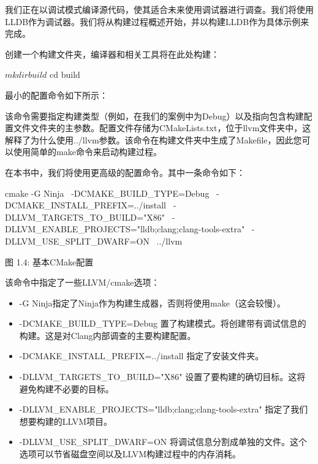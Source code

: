 

我们正在以调试模式编译源代码，使其适合未来使用调试器进行调查。我们将使用LLDB作为调试器。我们将从构建过程概述开始，并以构建LLDB作为具体示例来完成。


创建一个构建文件夹，编译器和相关工具将在此处构建：

\begin{shell}
$ mkdir build
$ cd build
\end{shell}

最小的配置命令如下所示：


该命令需要指定构建类型（例如，在我们的案例中为Debug）以及指向包含构建配置文件文件夹的主参数。配置文件存储为CMakeLists.txt，位于llvm文件夹中，这解释了为什么使用../llvm参数。该命令在构建文件夹中生成了Makefile，因此您可以使用简单的make命令来启动构建过程。

在本书中，我们将使用更高级的配置命令。其中一条命令如下：

\begin{shell}
cmake -G Ninja \
  -DCMAKE_BUILD_TYPE=Debug \
  -DCMAKE_INSTALL_PREFIX=../install \
  -DLLVM_TARGETS_TO_BUILD="X86" \
  -DLLVM_ENABLE_PROJECTS="lldb;clang;clang-tools-extra" \
  -DLLVM_USE_SPLIT_DWARF=ON \
  ../llvm
\end{shell}

\begin{center}
图 1.4: 基本CMake配置
\end{center}

该命令中指定了一些LLVM/cmake选项：

\begin{itemize}
\item
-G Ninja指定了Ninja作为构建生成器，否则将使用make（这会较慢）。

\item
-DCMAKE\_BUILD\_TYPE=Debug 置了构建模式。将创建带有调试信息的构建。这是对Clang内部调查的主要构建配置。

\item
-DCMAKE\_INSTALL\_PREFIX=../install 指定了安装文件夹。

\item
-DLLVM\_TARGETS\_TO\_BUILD="X86" 设置了要构建的确切目标。这将避免构建不必要的目标。

\item
-DLLVM\_ENABLE\_PROJECTS="lldb;clang;clang-tools-extra" 指定了我们想要构建的LLVM项目。

\item
-DLLVM\_USE\_SPLIT\_DWARF=ON 将调试信息分割成单独的文件。这个选项可以节省磁盘空间以及LLVM构建过程中的内存消耗。
\end{itemize}

